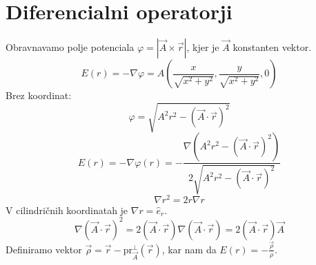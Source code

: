 \documentclass[a4paper]{article}
\newcommand{\vct}[1]{\overrightarrow{#1}}
\begin{document}
\section{Diferencialni operatorji}
Obravnavamo polje potenciala $\displaystyle{\varphi = \left|\vct{A}\times\vct{r}\right|}$, kjer je $\vct{A}$ konstanten vektor.
$$E(r) = -\nabla\varphi = A\left(\frac{x}{\sqrt{x^2 + y^2}}, \frac{y}{\sqrt{x^2 + y^2}}, 0\right)$$
Brez koordinat: $$\varphi = \sqrt{A^2r^2 - (\vct{A}\cdot\vct{r})^2}$$
$$E(r) = -\nabla\varphi(r) = -\frac{\nabla(A^2r^2 - (\vct{A}\cdot\vct{r})^2)}{2\sqrt{A^2r^2 - (\vct{A}\cdot\vct{r})^2}}$$
$$\nabla r^2 = 2r\nabla r$$
V cilindričnih koordinatah je $\nabla r = \hat{e}_r$.
$$\nabla(\vct{A}\cdot\vct{r})^2 = 2(\vct{A}\cdot\vct{r})\nabla(\vct{A}\cdot\vct{r}) = 2(\vct{A}\cdot\vct{r})\vct{A}$$
Definiramo vektor $\vct{\rho} = \vct{r} - \text{pr}_{\vct{A}}^{\perp}(\vct{r})$, kar nam da $\displaystyle{E(r) = -\frac{\vct{\rho}}{\rho}}$.
\end{document}
